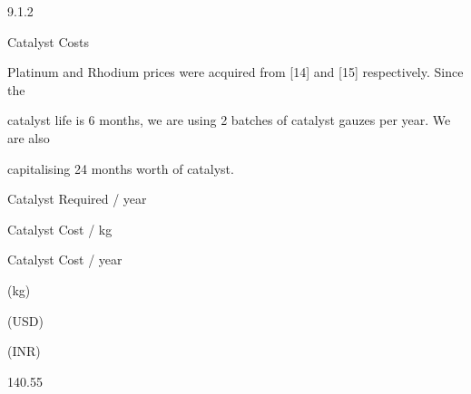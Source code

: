 \documentclass[a4paper,portrait,12pt]{article}
\begin{document}
9.1.2





\begin{flushleft}
Catalyst Costs
\end{flushleft}





\begin{flushleft}
Platinum and Rhodium prices were acquired from [14] and [15] respectively. Since the
\end{flushleft}


\begin{flushleft}
catalyst life is 6 months, we are using 2 batches of catalyst gauzes per year. We are also
\end{flushleft}


\begin{flushleft}
capitalising 24 months worth of catalyst.
\end{flushleft}


\begin{flushleft}
Catalyst Required / year
\end{flushleft}





\begin{flushleft}
Catalyst Cost / kg
\end{flushleft}





\begin{flushleft}
Catalyst Cost / year
\end{flushleft}





\begin{flushleft}
(kg)
\end{flushleft}





\begin{flushleft}
(USD)
\end{flushleft}





\begin{flushleft}
(INR)
\end{flushleft}





140.55
\end{document}

